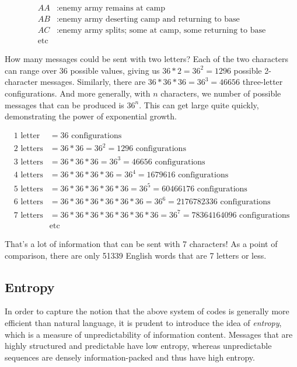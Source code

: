 \documentclass[UTF8]{book}
\begin{document}
\begin{CJK}{UTF8}{gbsn}
\begin{align*}
	AA&: \text{enemy army remains at camp} \\
	AB&: \text{enemy army deserting camp and returning to base} \\
	AC&: \text{enemy army splits; some at camp, some returning to base} \\
        \text{etc} &
\end{align*}

How many messages could be sent with two letters? Each of the two characters can range over 36 possible values, giving us $36*2=36^{2}=1296$ possible 2-character messages. Similarly, there are $36*36*36=36^{3}=46656$ three-letter configurations. And more generally, with $n$ characters, we number of possible messages that can be produced is $36^{n}$. This can get large quite quickly, demonstrating the power of exponential growth.

\begin{align*}
1 \text{ letter} &= 36 \text{ configurations} \\
2 \text{ letters} &= 36*36 = 36^{2} = 1296 \text{ configurations} \\
3 \text{ letters} &= 36*36*36 = 36^{3} = 46656 \text{ configurations} \\
4 \text{ letters} &= 36*36*36*36 = 36^{4} = 1679616 \text{ configurations} \\
5 \text{ letters} &= 36*36*36*36*36 = 36^{5} = 60466176 \text{ configurations} \\
6 \text{ letters} &= 36*36*36*36*36*36 = 36^{6} = 2176782336 \text{ configurations} \\
7 \text{ letters} &= 36*36*36*36*36*36*36 = 36^{7} = 78364164096 \text{ configurations} \\
&\text{etc}
\end{align*}

That's a lot of information that can be sent with 7 characters! As a point of comparison, there are only 51339 English words that are 7 letters or less.

\subsection{Entropy}

In order to capture the notion that the above system of codes is generally more efficient than natural language, it is prudent to introduce the idea of \emph{entropy}, which is a measure of unpredictability of information content. Messages that are highly structured and predictable have low entropy, whereas unpredictable sequences are densely information-packed and thus have high entropy.


\end{CJK}
\end{document}
